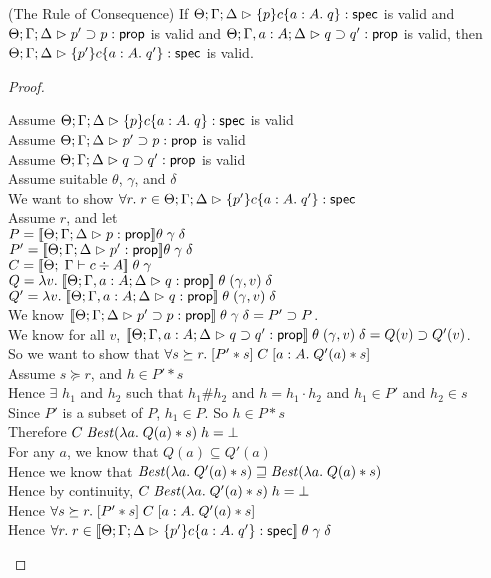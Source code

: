\begin{lemma}{(The Rule of Consequence)}
If $\judgeS{\spec{p}{c}{a:A}{q}}$ is valid and $\judgeA{p' \implies p}{\assert}$ is valid
and $\judgeA[\Theta; \Gamma,a:A; \Delta]{q \implies q'}{\assert}$ is valid, then $\judgeS{\spec{p'}{c}{a:A}{q'}}$ is valid.
\end{lemma}
\begin{proof}
\begin{tabbedproof}
\oo Assume $\judgeS{\spec{p}{c}{a:A}{q}}$ is valid \\
\oo Assume $\judgeA{p' \implies p}{\assert}$ is valid \\
\oo Assume $\judgeA{q \implies q'}{\assert}$ is valid \\
\oo Assume suitable $\theta$, $\gamma$, and $\delta$ \\
\ooo We want to show $\forall r.\; r \in \judgeS{\spec{p'}{c}{a:A}{q'}}$ \\
\ooo Assume $r$, and let \\
\ooox $P = \interp{\judgeA{p}{\assert}}\theta\;\gamma\;\delta$ \\
\ooox $P' = \interp{\judgeA{p'}{\assert}}\theta\;\gamma\;\delta$ \\
\ooox $C = \interp{\judgeC{\Gamma}{c}{A}}\;\theta\;\gamma$ \\
\ooox $Q = \semfun{v}{\interp{\judgeA[\Theta; \Gamma,a:A; \Delta]{q}{\assert}}\;\theta\;(\gamma, v)\;\delta}$ \\
\ooox $Q' = \semfun{v}{\interp{\judgeA[\Theta; \Gamma,a:A; \Delta]{q}{\assert}}\;\theta\;(\gamma, v)\;\delta}$ \\
\ooo We know $\interp{\judgeA{p' \implies p}{\assert}}\;\theta\;\gamma\;\delta = P' \implies P$. \\
\ooo We know for all $v$, $\interp{\judgeA[\Theta; \Gamma,a:A; \Delta]{q \implies q'}{\assert}}\;\theta\;(\gamma,v)\;\delta = Q(v) \implies Q'(v)$. \\
\ooo So we want to show that $\forall s \succeq r.\; \basicspec{P' * s}{C}{a:A}{Q'(a) * s}$ \\
\ooo Assume $s \succeq r$, and $h \in P' * s$ \\
\oooo Hence $\exists$ $h_1$ and $h_2$ such that $h_1 \# h_2$ and $h = h_1 \cdot h_2$ 
     and $h_1 \in P'$ and $h_2 \in s$ \\
\oooo Since $P'$ is a subset of $P$, $h_1 \in P$. So $h \in P * s$ \\
\oooo Therefore $C\;\mathit{Best}(\semfun{a}{Q(a) * s})\;h = \bot$ \\
\oooo For any $a$, we know that $Q(a) \subseteq Q'(a)$ \\
\oooo Hence  we know that $\mathit{Best}(\semfun{a}{Q'(a) * s}) \sqsupseteq \mathit{Best}(\semfun{a}{Q(a) * s})$ \\
\oooo Hence by continuity, $C\;\mathit{Best}(\semfun{a}{Q'(a) * s})\;h = \bot$ \\
\ooo Hence $\forall s \succeq r.\; \basicspec{P' * s}{C}{a:A}{Q'(a) * s}$ \\
\ooo Hence $\forall r.\; r \in \interp{\judgeS{\spec{p'}{c}{a:A}{q'}}}\;\theta\;\gamma\;\delta$ \\




\end{tabbedproof}
\end{proof}
